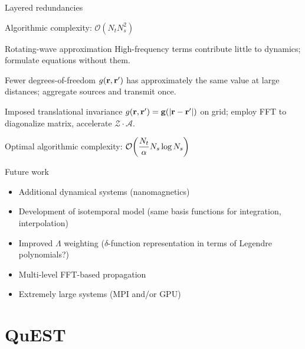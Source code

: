 \documentclass[aspectratio=169]{beamer}
\newcommand{\oper}[1]{\mathcal{#1}}
\begin{document}
\begin{frame}{Layered redundancies}
  \begin{center}
    Algorithmic complexity: $\displaystyle\mathcal{O}(N_t N_s^2)$
  \end{center}
  \begin{block}{Rotating-wave approximation}
    High-frequency terms contribute little to dynamics; formulate equations without them.
  \end{block}
  \begin{block}{Fewer degrees-of-freedom}
    $g(\vb{r}, \vb{r}')$ has approximately the same value at large distances; aggregate sources and transmit once. 
  \end{block}
  \begin{block}{Imposed translational invariance}
    $g(\vb{r}, \vb{r}') = \vb{g}(\abs{\vb{r} - \vb{r}'})$ on grid; employ FFT to diagonalize matrix, accelerate $\oper{Z}\cdot\oper{A}$.
  \end{block}
  \begin{center}
    Optimal algorithmic complexity: $\displaystyle\mathcal{O}\qty(\frac{N_t}{\alpha} N_s \log N_s)$
  \end{center}
\end{frame}

\begin{frame}{Future work}
  \begin{itemize}
    \item Additional dynamical systems (nanomagnetics)
    \item Development of isotemporal model (same basis functions for integration, interpolation)
    \item Improved $\Lambda$ weighting ($\delta$-function representation in terms of Legendre polynomials?)
    \item Multi-level FFT-based propagation
    \item Extremely large systems (MPI and/or GPU)
  \end{itemize}
\end{frame}

\section{QuEST}
\end{document}
